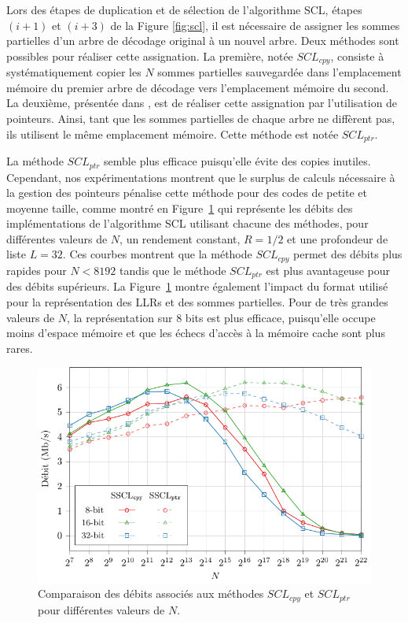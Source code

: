 Lors des étapes de duplication et de sélection de l'algorithme SCL, étapes $(i+1)$ et $(i+3)$ de la Figure \ref{fig:scl}, il est nécessaire de assigner les sommes partielles d'un arbre de décodage original à un nouvel arbre. Deux méthodes sont possibles pour réaliser cette assignation. La première, notée $SCL_{cpy}$, consiste à systématiquement copier les $N$ sommes partielles sauvegardée dans l'emplacement mémoire du premier arbre de décodage vers l'emplacement mémoire du second. La deuxième, présentée dans \cite{tal_list_2011}, est de réaliser cette assignation par l'utilisation de pointeurs. Ainsi, tant que les sommes partielles de chaque arbre ne diffèrent pas, ils utilisent le même emplacement mémoire. Cette méthode est notée $SCL_{ptr}$.

La méthode $SCL_{ptr}$ semble plus efficace puisqu'elle évite des copies inutiles. Cependant, nos expérimentations montrent que le surplus de calculs nécessaire à la gestion des pointeurs pénalise cette méthode pour des codes de petite et moyenne taille, comme montré en Figure~\ref{fig:scl_mem} qui représente les débits des implémentations de l'algorithme SCL utilisant chacune des méthodes, pour différentes valeurs de $N$, un rendement constant, $R=1/2$ et une profondeur de liste $L=32$. Ces courbes montrent que la méthode $SCL_{cpy}$ permet des débits plus rapides pour $N<8192$ tandis que le méthode $SCL_{ptr}$ est plus avantageuse pour des débits supérieurs. La Figure~\ref{fig:scl_mem} montre également l'impact du format utilisé pour la représentation des LLRs et des sommes partielles. Pour de très grandes valeurs de $N$, la représentation sur 8 bits est plus efficace, puisqu'elle occupe moins d'espace mémoire et que les échecs d'accès à la mémoire cache sont plus rares. 

\begin{figure}
\centering
\includegraphics{main/ch2_fig/curves/thr/tikz/thr}
\caption{Comparaison des débits associés aux méthodes $SCL_{cpy}$ et $SCL_{ptr}$ pour différentes valeurs de $N$.}
\label{fig:scl_mem}
\end{figure}




